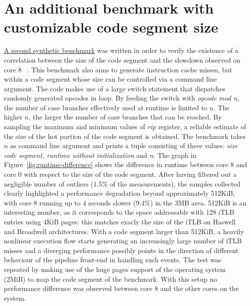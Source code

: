 \documentclass[a4paper]{jpconf}
\begin{document}
\section{An additional benchmark with customizable code segment size}
\label{section:benchmark-itlb}
\href{https://gitlab.cern.ch/snippets/217}{A second synthetic benchmark}
was written in order to verify the existence of a
correlation between the size of the code segment and the slowdown observed on core 8
~\cite{synthetic_benchmark:icache_misses_variable_code_segment}. 
This benchmark also aims to generate instruction cache misses,
but within a code segment whose size can be controlled via a command line
argument. The code makes use of a large switch statement that dispatches
randomly generated opcodes in loop. By feeding the switch with \textit{opcode mod n}, the number of case
branches effectively used at runtime is limited to $n$. The higher $n$, the larger the
number of case branches that can be reached. By sampling the
maximum and minimum values of \textit{rip} register, a reliable estimate of the
size of the hot portion of the code segment is obtained. The
benchmark takes $n$ as command line argument and prints a tuple consisting of
three values: \textit{size code segment, runtime without initialization} and \textit{n}.
The graph in Figure~\ref{fig:runtime-difference} shows the difference in runtime
between core 8 and core 0 with respect to the size of the code segment. After having
filtered out a negligible number of outliers (1.5\% of the measurements),
the samples collected clearly highlighted a performance
degradation beyond approximately 512KiB, with core 8 running up to 4 seconds slower
(9.4\%) in the 3MB area. 512KiB is an interesting number, as it
corresponds to the space addressable with 128 iTLB entries using 4KiB pages: this
matches exacly the size of the iTLB on Haswell and Broadwell architectures.
With a code segment larger than 512KiB, a heavily nonlinear execution flow starts generating an increasingly
large number of iTLB misses and a diverging performance possibly points in the direction of different
behaviour of the pipeline front-end in handling such events. The test was repeated 
by making use of the huge pages support of the operating
system (2MiB) to map the code segment of the benchmark. With this setup no 
performance difference was observed between core 8 and the other cores on the system.
\end{document}
